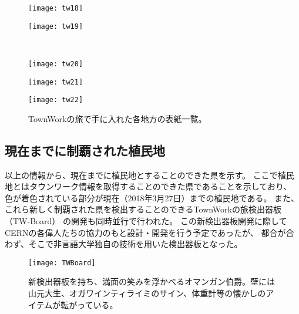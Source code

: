 \newpage
\begin{figure}[htbp]
\vspace{-10mm}
    \centering
  \begin{minipage}{0.4\linewidth}
    \centering
    \texttt{[image: tw18]}
  \end{minipage}
  \begin{minipage}{0.4\linewidth}
    \centering
    \texttt{[image: tw19]}
  \end{minipage}\\
  \begin{minipage}{0.4\linewidth}
    \centering
    \texttt{[image: tw20]}
  \end{minipage}
  \begin{minipage}{0.4\linewidth}
    \centering
    \texttt{[image: tw21]}
  \end{minipage}
  \begin{minipage}{0.4\linewidth}
    \centering
    \texttt{[image: tw22]}
  \end{minipage}
  \caption{TownWorkの旅で手に入れた各地方の表紙一覧。}
  \label{CscDetaDphi-CSide}
\end{figure}

\newpage
\clearpage
\subsection{現在までに制覇された植民地}
以上の情報から、現在までに植民地とすることのできた県を示す。
ここで植民地とはタウンワーク情報を取得することのできた県であることを示しており、
色が着色されている部分が現在（2018年3月27日）までの植民地である。
また、これら新しく制覇された県を検出することのできるTownWorkの旅検出器板（TW-Board）
の開発も同時並行で行われた。
この新検出器板開発に際してCERNの各偉人たちの協力のもと設計・開発を行う予定であったが、
都合が合わず、そこで非言語大学独自の技術を用いた検出器板となった。

\begin{figure}
\centering
\texttt{[image: TWBoard]}
\caption{新検出器板を持ち、満面の笑みを浮かべるオマンガン伯爵。壁には山元大生、オガワインティライミのサイン、体重計等の懐かしのアイテムが転がっている。}
\label{oyayubi}
\end{figure}

\newpage
\clearpage
